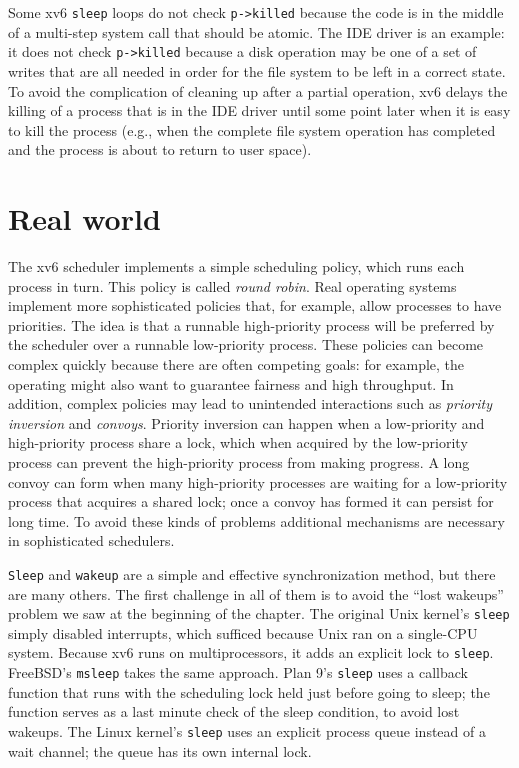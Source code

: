 Some xv6 
\lstinline{sleep}
loops do not check
\lstinline{p->killed} 
because the code is in the middle of a multi-step
system call that should be atomic.
The IDE driver
is an example: it does not check
\lstinline{p->killed}
because a disk operation may be one of a set of
writes that are all needed in order for the file system to
be left in a correct state.
To avoid the complication of cleaning up after a partial operation, xv6 delays
the killing of a process that is in the IDE driver until some point later when
it is easy to kill the process (e.g., when the complete file system operation
has completed and the process is about to return to user space).
\section{Real world}

The xv6 scheduler implements a simple scheduling policy, which runs each process
in turn.  This policy is called
\textit{round robin}.
Real operating systems implement more sophisticated policies that, for example,
allow processes to have priorities.  The idea is that a runnable high-priority process
will be preferred by the scheduler over a runnable low-priority process.   These
policies can become complex quickly because there are often competing goals: for
example, the operating might also want to guarantee fairness and
high throughput.  In addition, complex policies may lead to unintended
interactions such as
\textit{priority inversion}
and 
\textit{convoys}.
Priority inversion can happen when a low-priority and high-priority process
share a lock, which when acquired by the low-priority process can prevent the
high-priority process from making progress.  A long convoy can form when many
high-priority processes are waiting for a low-priority process that acquires a
shared lock; once a convoy has formed it can persist for long time.
To avoid these kinds of problems additional mechanisms are necessary in
sophisticated schedulers.

\lstinline{Sleep}
and
\lstinline{wakeup}
are a simple and effective synchronization method,
but there are many others.
The first challenge in all of them is to
avoid the ``lost wakeups'' problem we saw at the
beginning of the chapter.
The original Unix kernel's
\lstinline{sleep}
simply disabled interrupts,
which sufficed because Unix ran on a single-CPU system.
Because xv6 runs on multiprocessors,
it adds an explicit lock to
\lstinline{sleep}.
FreeBSD's
\lstinline{msleep}
takes the same approach.
Plan 9's 
\lstinline{sleep}
uses a callback function that runs with the scheduling
lock held just before going to sleep;
the function serves as a last minute check
of the sleep condition, to avoid lost wakeups.
The Linux kernel's
\lstinline{sleep}
uses an explicit process queue instead of
a wait channel; the queue has its own internal lock.

